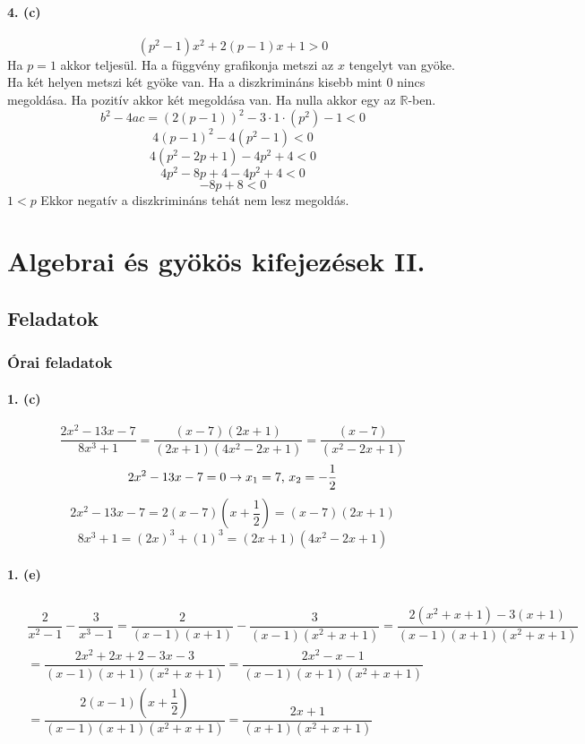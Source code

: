 \documentclass[12pt,a4paper,fleqn]{article}
\newcommand{\myparagraph}[1]{\paragraph{#1}\mbox{}}
\begin{document}
\myparagraph{4. (c)}
\[ (p^2-1)x^2 + 2(p-1)x + 1 > 0 \]
Ha $p=1$ akkor teljesül.
Ha a függvény grafikonja metszi az $x$ tengelyt van gyöke. Ha két helyen metszi
két gyöke van. Ha a diszkrimináns kisebb mint 0 nincs megoldása. Ha pozitív
akkor két megoldása van. Ha nulla akkor egy az $\mathbb{R}$-ben.
\[ b^2-4ac=(2(p-1))^2-3 \cdot 1 \cdot (p^2)-1 < 0 \]
\[ 4(p-1)^2 - 4(p^2 - 1) < 0 \]
\[ 4(p^2 - 2p + 1) - 4p^2 + 4 < 0 \]
\[ 4p^2 - 8p + 4 - 4p^2 + 4 < 0 \]
\[ -8p + 8 < 0 \]
$ 1 < p $ Ekkor negatív a diszkrimináns tehát nem lesz megoldás.



\section{Algebrai és gyökös kifejezések II.}
\setcounter{subsection}{1}
\subsection{Feladatok}
\subsubsection{Órai feladatok}


\myparagraph{1. (c)}
\[ \dfrac{2x^2-13x-7}{8x^3+1} = \dfrac{(x-7)(2x+1)}{(2x+1)(4x^2-2x+1)} =
  \dfrac{(x-7)}{(x^2-2x+1)} \]
\[ 2x^2-13x-7=0 \rightarrow x_1 = 7$, $x_2 = -\dfrac{1}{2} \]
\[ 2x^2-13x-7=2(x-7)(x+\dfrac{1}{2})=(x-7)(2x+1) \]
\[ 8x^3 + 1 = (2x)^3 + (1)^3 = (2x+1)(4x^2-2x+1) \]


\myparagraph{1. (e)}
\begin{align*}
  \begin{split}
    & \dfrac{2}{x^2-1} -\dfrac{3}{x^3-1} = \dfrac{2}{(x-1)(x+1)} - \dfrac{3}{(x-1)(x^2+x+1)} =
        \dfrac{2(x^2+x+1)-3(x+1)}{(x-1)(x+1)(x^2+x+1)} \\[10pt]
    &= \dfrac{2x^2+2x+2-3x-3}{(x-1)(x+1)(x^2+x+1)} = \dfrac{2x^2-x-1}{(x-1)(x+1)(x^2+x+1)} \\[10pt]
    &= \dfrac{2(x-1)(x+\dfrac{1}{2})}{(x-1)(x+1)(x^2+x+1)} = \dfrac{2x+1}{(x+1)(x^2+x+1)}
  \end{split}
\end{align*}
\end{document}
